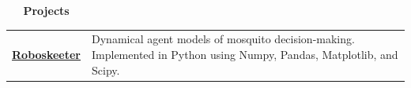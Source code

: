 \documentclass[a4paper,12pt]{article}
\newcommand{\resheading}[1]{{\vspace*{.06in} \colorbox{mygrey}{\begin{minipage}{\textwidth}{\textmd{\large \textbf{#1} \vphantom{p\^{E}}}}\end{minipage}}} }
\newcommand{\ressubheading}[4]{
        \textbf{#1} \hfill #2\\
        \textit{#3} \hfill #4 \\}
\begin{document}
\resheading{~\faCodeFork~ Projects}

\begin{tabularx}{\textwidth}{p{3.5cm}>{\arraybackslash}X}
{\ffmfamily\bfseries{\href{https://github.com/crypdick/RoboSkeeter}{Roboskeeter }}} & Dynamical agent models of mosquito decision-making. Implemented in Python using Numpy, Pandas, Matplotlib, and Scipy.\\
\end{tabularx}

%
    


\end{document}
